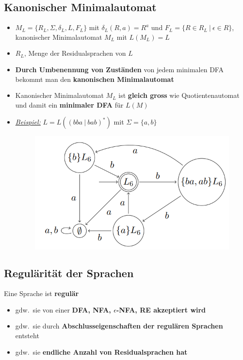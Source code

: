 \documentclass[ieeetran]{article}
\begin{document}
\subsection{Kanonischer Minimalautomat} %
\label{sub:kanonischer_minimalautomat}

\begin{itemize}
	\item $M_L = \{R_L, \Sigma, \delta_L, L, F_L\}$ mit $\delta_L(R,a) = R^a$ und $F_L = \{R \in R_L \ | \ \epsilon \in R\}$, kanonischer Minimalautomat $M_L$ mit $L(M_L) = L$
	\item $R_L$, Menge der Residualsprachen von $L$ 

\item \textbf{Durch Umbenennung von Zuständen} von jedem minimalen DFA bekommt man den \textbf{kanonischen Minimalautomat}

\item Kanonischer Minimalautomat $M_L$ ist \textbf{gleich gross} wie Quotientenautomat und damit ein \textbf{minimaler DFA} für $L(M)$

\item \textit{\underline{Beispiel:}} $L = L((bba \ | \ bab)^*)$ mit $\Sigma = \{a, b\}$
\begin{figure}[h!]
  \centering
  \includegraphics[width=0.5\linewidth]{kanonischerdfa.png}
  \label{fig:kanonischerdfa_png}
\end{figure}
\end{itemize}

\subsection{Regulärität der Sprachen} %
\label{sub:regulärität_der_sprachen}
Eine Sprache ist \textbf{regulär}

\begin{itemize}
  \item gdw.\ sie von einer \textbf{DFA, NFA, $\epsilon$-NFA, RE akzeptiert wird}
\item gdw.\ sie durch \textbf{Abschlusseigenschaften der regulären Sprachen} entsteht

\item gdw.\ sie \textbf{endliche Anzahl von Residualsprachen hat}
\end{itemize}
\end{document}
